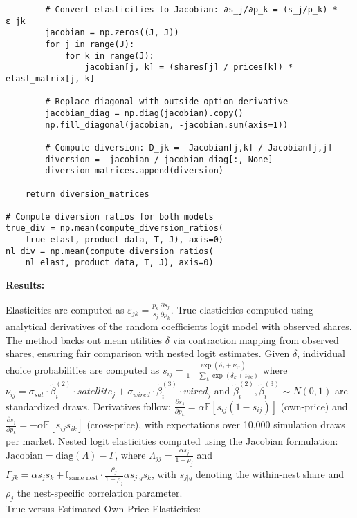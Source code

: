 \documentclass[english,11pt]{article}
\begin{document}
\begin{enumerate}
\begin{verbatim}
        # Convert elasticities to Jacobian: ∂s_j/∂p_k = (s_j/p_k) * ε_jk
        jacobian = np.zeros((J, J))
        for j in range(J):
            for k in range(J):
                jacobian[j, k] = (shares[j] / prices[k]) * elast_matrix[j, k]
        
        # Replace diagonal with outside option derivative
        jacobian_diag = np.diag(jacobian).copy()
        np.fill_diagonal(jacobian, -jacobian.sum(axis=1))
        
        # Compute diversion: D_jk = -Jacobian[j,k] / Jacobian[j,j]
        diversion = -jacobian / jacobian_diag[:, None]
        diversion_matrices.append(diversion)
    
    return diversion_matrices

# Compute diversion ratios for both models
true_div = np.mean(compute_diversion_ratios(
    true_elast, product_data, T, J), axis=0)
nl_div = np.mean(compute_diversion_ratios(
    nl_elast, product_data, T, J), axis=0)
\end{verbatim}

\pagebreak

\noindent \textbf{Results:} 

\noindent Elasticities are computed as $\varepsilon_{jk} = \frac{p_k}{s_j} \frac{\partial s_j}{\partial p_k}$. True elasticities computed using analytical derivatives of the random coefficients logit model with observed shares. The method backs out mean utilities $\delta$ via contraction mapping from observed shares, ensuring fair comparison with nested logit estimates. Given $\delta$, individual choice probabilities are computed as $s_{ij} = \frac{\exp(\delta_j + \nu_{ij})}{1 + \sum_k \exp(\delta_k + \nu_{ik})}$ where $\nu_{ij} = \sigma_{sat} \cdot \tilde{\beta}_i^{(2)} \cdot satellite_j + \sigma_{wired} \cdot \tilde{\beta}_i^{(3)} \cdot wired_j$ and $\tilde{\beta}_i^{(2)}, \tilde{\beta}_i^{(3)} \sim N(0,1)$ are standardized draws. Derivatives follow: $\frac{\partial s_j}{\partial p_k} = \alpha \mathbb{E}[s_{ij}(1-s_{ij})]$ (own-price) and $\frac{\partial s_j}{\partial p_k} = -\alpha \mathbb{E}[s_{ij}s_{ik}]$ (cross-price), with expectations over 10,000 simulation draws per market. Nested logit elasticities computed using the Jacobian formulation: $\text{Jacobian} = \text{diag}(\Lambda) - \Gamma$, where $\Lambda_{jj} = \frac{\alpha s_j}{1-\rho_j}$ and $\Gamma_{jk} = \alpha s_j s_k + \mathbb{I}_{\text{same nest}} \cdot \frac{\rho_j}{1-\rho_j} \alpha s_{j|g} s_k$, with $s_{j|g}$ denoting the within-nest share and $\rho_j$ the nest-specific correlation parameter. 
\\
\newline
True versus Estimated Own-Price Elasticities:



\end{enumerate}
\end{document}
